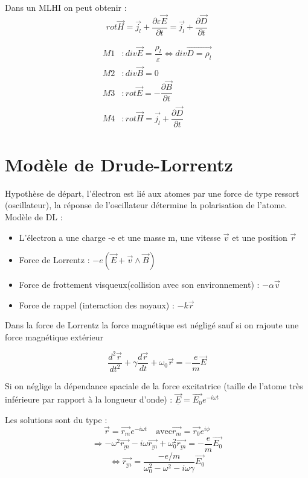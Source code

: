\documentclass[12pt,a4paper]{report}
\begin{document}
Dans un MLHI on peut obtenir : 
\[
	rot \vec{H} = \vec{j_l} + \dfrac{\partial \varepsilon \vec{E}}{\partial t} = \vec{j_l} + \dfrac{\partial \vec{D}}{\partial t}
\]

\begin{align*}
	M1 &: div \vec{E} = \dfrac{\rho_l}{\varepsilon} \Leftrightarrow div \vec{D = \rho_l}\\
	M2 &: div \vec{B} = 0\\
	M3 &:  rot \vec{E} = - \dfrac{\partial \vec{B}}{\partial t}\\
	M4 &: rot \vec{H} = \vec{j_l} + \dfrac{\partial \vec{D}}{\partial t}
\end{align*}

\section{Modèle de Drude-Lorrentz}

Hypothèse de départ, l'électron est lié aux atomes par une force de type ressort (oscillateur), la réponse de l'oscillateur détermine la polarisation de l'atome.\\
Modèle de DL :

\begin{itemize}
	\item L'électron a une charge -e et une masse m, une vitesse \(\vec{v}\) et une position \(\vec{r}\)
	\item Force de Lorrentz : \(-e (\vec{E} + \vec{v} \wedge \vec{B})\)
	\item Force de frottement visqueux(collision avec son environnement) : \(- \alpha \vec{v}\)
	\item Force de rappel (interaction des noyaux) : \(- k \vec{r}\)
\end{itemize}

Dans la force de Lorrentz la force magnétique est négligé sauf si on rajoute une force magnétique extérieur

\[
	\dfrac{d^2 \vec{r}}{dt^2} + \gamma \dfrac{d\vec{r}}{dt} + \omega_0 \vec{r} = -\dfrac{e}{m} \vec{E}
\]

Si on néglige la dépendance spaciale de la force excitatrice (taille de l'atome très inférieure par rapport à la longueur d'onde) : \(\underline{\vec{E}} = \vec{E_0} e^{-i\omega t}\)

Les solutions sont du type :
\[
	\vec{r} = \vec{r_m} e^{-i\omega t} \quad \text{avec} \vec{r_m} = \vec{r_0} e^{i\phi}
\]
\[
	\Rightarrow-\omega^2 \underline{\vec{r_m}} - i\omega \underline{\vec{r_m}} + \omega_0^2 \underline{\vec{r_m}} = -\dfrac{e}{m} \vec{E_0}
\]
\[
	\Leftrightarrow \underline{\vec{r_m}} = \dfrac{-e/m}{\omega_0^2 - \omega^2 - i\omega \gamma} \vec{E_0}
\]
\end{document}
